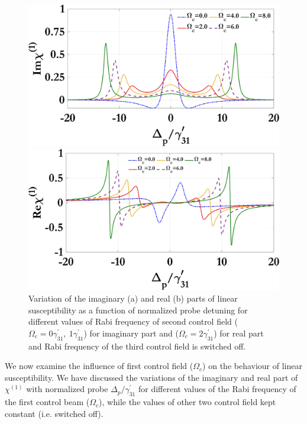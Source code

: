 \documentclass[12pt,a4paper]{article}
\begin{document}
\begin{figure}[ht]
  \centering
  \begin{minipage}{0.48\textwidth}
    \centering
    \includegraphics[width=\linewidth]{Plots/Img_chi1_Omega_c.jpeg}
    \subcaption{}
  \end{minipage}%
  \hfill
  \begin{minipage}{0.48\textwidth}
    \centering
    \includegraphics[width=\linewidth]{Plots/Real_chi1_Omega_c.jpeg}
    \subcaption{}
  \end{minipage}
  \caption{Variation of the imaginary (a) and real (b) parts of linear susceptibility as a function of normalized probe detuning for different values of Rabi frequency of second control field ($\Omega_c=0\gamma^{\prime}_{31},\ 1\gamma^{\prime}_{31}$) for imaginary part and ($\Omega_c=2\gamma^{\prime}_{31}$) for real part and Rabi frequency of the third control field is switched off.}
  \label{fig:real_omegac}
\end{figure}

We now examine the influence of first control field ($\Omega_{c}$) on the behaviour of linear susceptibility. We have discussed the variations of the imaginary and real part of $\chi^{(1)}$ with normalized probe $\Delta_{p}/\gamma^{\prime}_{31}$ for different values of the Rabi frequency of the first control beam ($\Omega_c$), while the values of other two control field kept constant (i.e. switched off).
\end{document}

